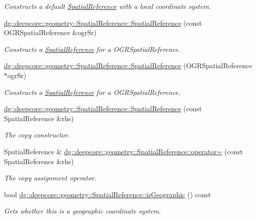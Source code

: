 \begin{DoxyCompactItemize}
\begin{DoxyCompactList}\small\item\em Constructs a default \hyperlink{classdg_1_1deepcore_1_1geometry_1_1_spatial_reference}{Spatial\+Reference} with a local coordinate system. \end{DoxyCompactList}\item 
\hyperlink{group___imagery_module_ga69e2cbc90f02865a0847647e59f64483}{dg\+::deepcore\+::geometry\+::\+Spatial\+Reference\+::\+Spatial\+Reference} (const O\+G\+R\+Spatial\+Reference \&ogr\+Sr)
\begin{DoxyCompactList}\small\item\em Constructs a \hyperlink{classdg_1_1deepcore_1_1geometry_1_1_spatial_reference}{Spatial\+Reference} for a O\+G\+R\+Spatial\+Reference. \end{DoxyCompactList}\item 
\hyperlink{group___imagery_module_gae24120971e90069c45802d2c6eca0472}{dg\+::deepcore\+::geometry\+::\+Spatial\+Reference\+::\+Spatial\+Reference} (O\+G\+R\+Spatial\+Reference $\ast$ogr\+Sr)
\begin{DoxyCompactList}\small\item\em Constructs a \hyperlink{classdg_1_1deepcore_1_1geometry_1_1_spatial_reference}{Spatial\+Reference} for a O\+G\+R\+Spatial\+Reference. \end{DoxyCompactList}\item 
\hyperlink{group___imagery_module_gae3c45a81c4b51c965c5bbf0b1d01e3b8}{dg\+::deepcore\+::geometry\+::\+Spatial\+Reference\+::\+Spatial\+Reference} (const Spatial\+Reference \&rhs)
\begin{DoxyCompactList}\small\item\em The copy constructor. \end{DoxyCompactList}\item 
Spatial\+Reference \& \hyperlink{group___imagery_module_gab5c9702deb9e8e005780196b5a5b7b4f}{dg\+::deepcore\+::geometry\+::\+Spatial\+Reference\+::operator=} (const Spatial\+Reference \&rhs)
\begin{DoxyCompactList}\small\item\em The copy assignment operator. \end{DoxyCompactList}\item 
bool \hyperlink{group___imagery_module_ga104ad283cf3f583194751ebb95ccd36c}{dg\+::deepcore\+::geometry\+::\+Spatial\+Reference\+::is\+Geographic} () const 
\begin{DoxyCompactList}\small\item\em Gets whether this is a geographic coordinate system. \end{DoxyCompactList}\item 

\end{DoxyCompactItemize}
